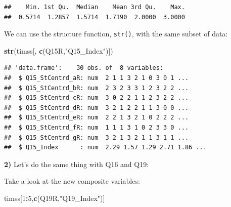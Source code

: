 \documentclass[
]{article}
\newenvironment{Shaded}{\begin{snugshade}}{\end{snugshade}}
\newcommand{\DataTypeTok}[1]{\textcolor[rgb]{0.13,0.29,0.53}{#1}}
\newcommand{\DecValTok}[1]{\textcolor[rgb]{0.00,0.00,0.81}{#1}}
\newcommand{\KeywordTok}[1]{\textcolor[rgb]{0.13,0.29,0.53}{\textbf{#1}}}
\newcommand{\NormalTok}[1]{#1}
\newcommand{\OperatorTok}[1]{\textcolor[rgb]{0.81,0.36,0.00}{\textbf{#1}}}
\newcommand{\OtherTok}[1]{\textcolor[rgb]{0.56,0.35,0.01}{#1}}
\newcommand{\StringTok}[1]{\textcolor[rgb]{0.31,0.60,0.02}{#1}}
\begin{document}
\begin{verbatim}
##    Min. 1st Qu.  Median    Mean 3rd Qu.    Max. 
##  0.5714  1.2857  1.5714  1.7190  2.0000  3.0000
\end{verbatim}

We can use the structure function, \texttt{str()}, with the same subset of data:

\begin{Shaded}
\begin{Highlighting}[]
\KeywordTok{str}\NormalTok{(timss[, }\KeywordTok{c}\NormalTok{(Q15R,}\StringTok{"Q15_Index"}\NormalTok{)])}
\end{Highlighting}
\end{Shaded}

\begin{verbatim}
## 'data.frame':    30 obs. of  8 variables:
##  $ Q15_StCentrd_aR: num  2 1 1 3 2 1 0 3 0 1 ...
##  $ Q15_StCentrd_bR: num  2 3 2 3 3 1 2 3 2 2 ...
##  $ Q15_StCentrd_cR: num  3 0 2 2 1 1 2 3 2 2 ...
##  $ Q15_StCentrd_dR: num  3 2 1 2 2 1 1 3 0 0 ...
##  $ Q15_StCentrd_eR: num  2 2 1 3 2 1 0 2 2 2 ...
##  $ Q15_StCentrd_fR: num  1 1 1 3 1 0 2 3 3 0 ...
##  $ Q15_StCentrd_gR: num  3 2 1 3 2 1 1 3 1 1 ...
##  $ Q15_Index      : num  2.29 1.57 1.29 2.71 1.86 ...
\end{verbatim}

\textbf{2)} Let's do the same thing with Q16 and Q19:

\begin{Shaded}
\end{Shaded}

Take a look at the new composite variables:

\begin{Shaded}
\begin{Highlighting}[]
\NormalTok{timss[}\DecValTok{1}\OperatorTok{:}\DecValTok{5}\NormalTok{,}\KeywordTok{c}\NormalTok{(Q19R,}\StringTok{"Q19_Index"}\NormalTok{)]  }
\end{Highlighting}
\end{Shaded}
\end{document}
